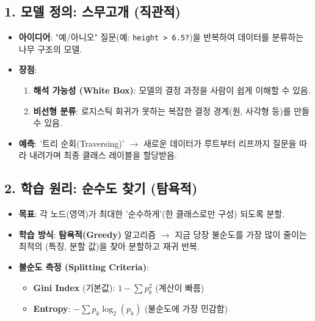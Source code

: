 \documentclass[11pt,a4paper]{book}
\theoremstyle{definition}
\begin{document}
\begin{tcolorbox}[title={결정 트리(Decision Tree) 한눈에 보기}]
    \subsection*{1. 모델 정의: 스무고개 (직관적)}
    \begin{itemize}
        \item \textbf{아이디어}: "예/아니오" 질문(예: \texttt{height > 6.5?})을 반복하여 데이터를 분류하는 나무 구조의 모델.
        \item \textbf{장점}:
            \begin{enumerate}
                \item \textbf{해석 가능성 (White Box)}: 모델의 결정 과정을 사람이 쉽게 이해할 수 있음.
                \item \textbf{비선형 분류}: 로지스틱 회귀가 못하는 복잡한 결정 경계(원, 사각형 등)를 만들 수 있음.
            \end{enumerate}
        \item \textbf{예측}: '트리 순회(Traversing)' $\rightarrow$ 새로운 데이터가 루트부터 리프까지 질문을 따라 내려가며 최종 클래스 레이블을 할당받음.
    \end{itemize}

    \subsection*{2. 학습 원리: 순수도 찾기 (탐욕적)}
    \begin{itemize}
        \item \textbf{목표}: 각 노드(영역)가 최대한 '순수하게'(한 클래스로만 구성) 되도록 분할.
        \item \textbf{학습 방식}: \textbf{탐욕적(Greedy)} 알고리즘 $\rightarrow$ 지금 당장 불순도를 가장 많이 줄이는 최적의 (특징, 분할 값)을 찾아 분할하고 재귀 반복.
        \item \textbf{불순도 측정 (Splitting Criteria)}:
            \begin{itemize}
                \item \textbf{Gini Index} (기본값): $1 - \sum p_k^2$ (계산이 빠름)
                \item \textbf{Entropy}: $- \sum p_k \log_2(p_k)$ (불순도에 가장 민감함)
            \end{itemize}
    \end{itemize}


\end{tcolorbox}
\end{document}

